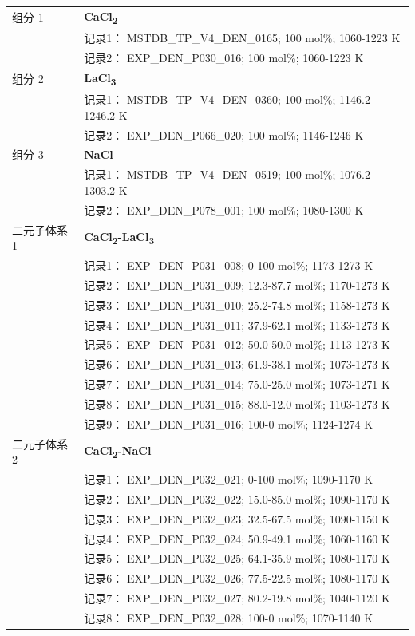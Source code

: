 \documentclass[12pt]{article}
\begin{document}
{\begin{longtable}[]{@{}
  >{\raggedright\arraybackslash}p{}
  >{\raggedright\arraybackslash}p{}@{}}
组分 1  & \textbf{CaCl\textsubscript{2}} \\
 & 记录1： MSTDB\_TP\_V4\_DEN\_0165; 100 mol\%; 1060-1223 K \\
 & 记录2： EXP\_DEN\_P030\_016; 100 mol\%; 1060-1223 K  \\

组分 2  & \textbf{LaCl\textsubscript{3}} \\
 & 记录1： MSTDB\_TP\_V4\_DEN\_0360; 100 mol\%; 1146.2-1246.2 K \\
 & 记录2： EXP\_DEN\_P066\_020; 100 mol\%; 1146-1246 K  \\

组分 3  & \textbf{NaCl} \\
 & 记录1： MSTDB\_TP\_V4\_DEN\_0519; 100 mol\%; 1076.2-1303.2 K \\
 & 记录2： EXP\_DEN\_P078\_001; 100 mol\%; 1080-1300 K  \\

二元子体系 1  & \textbf{CaCl\textsubscript{2}-LaCl\textsubscript{3}} \\
 & 记录1： EXP\_DEN\_P031\_008; 0-100 mol\%; 1173-1273 K \\
 & 记录2： EXP\_DEN\_P031\_009; 12.3-87.7 mol\%; 1170-1273 K \\
 & 记录3： EXP\_DEN\_P031\_010; 25.2-74.8 mol\%; 1158-1273 K \\
 & 记录4： EXP\_DEN\_P031\_011; 37.9-62.1 mol\%; 1133-1273 K \\
 & 记录5： EXP\_DEN\_P031\_012; 50.0-50.0 mol\%; 1113-1273 K \\
 & 记录6： EXP\_DEN\_P031\_013; 61.9-38.1 mol\%; 1073-1273 K \\
 & 记录7： EXP\_DEN\_P031\_014; 75.0-25.0 mol\%; 1073-1271 K \\
 & 记录8： EXP\_DEN\_P031\_015; 88.0-12.0 mol\%; 1103-1273 K \\
 & 记录9： EXP\_DEN\_P031\_016; 100-0 mol\%; 1124-1274 K  \\

二元子体系 2  & \textbf{CaCl\textsubscript{2}-NaCl} \\
 & 记录1： EXP\_DEN\_P032\_021; 0-100 mol\%; 1090-1170 K \\
 & 记录2： EXP\_DEN\_P032\_022; 15.0-85.0 mol\%; 1090-1170 K \\
 & 记录3： EXP\_DEN\_P032\_023; 32.5-67.5 mol\%; 1090-1150 K \\
 & 记录4： EXP\_DEN\_P032\_024; 50.9-49.1 mol\%; 1060-1160 K \\
 & 记录5： EXP\_DEN\_P032\_025; 64.1-35.9 mol\%; 1080-1170 K \\
 & 记录6： EXP\_DEN\_P032\_026; 77.5-22.5 mol\%; 1080-1170 K \\
 & 记录7： EXP\_DEN\_P032\_027; 80.2-19.8 mol\%; 1040-1120 K \\
 & 记录8： EXP\_DEN\_P032\_028; 100-0 mol\%; 1070-1140 K  \\


\end{longtable}}
\end{document}
